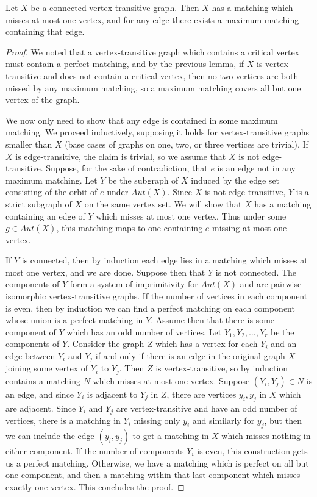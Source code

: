 \begin{theorem}
	Let $X$ be a connected vertex-transitive graph.  Then $X$ has a matching which misses at most one vertex, and for any edge there exists a maximum matching containing that edge.  
\end{theorem}
\begin{proof}
	We noted that a vertex-transitive graph which contains a critical vertex must contain a perfect matching, and by the previous lemma, if $X$ is vertex-transitive and does not contain a critical vertex, then no two vertices are both missed by any maximum matching, so a maximum matching covers all but one vertex of the graph.
	
	We now only need to show that any edge is contained in some maximum matching.  We proceed inductively, supposing it holds for vertex-transitive graphs smaller than $X$ (base cases of graphs on one, two, or three vertices are trivial).  If $X$ is edge-transitive, the claim is trivial, so we assume that $X$ is not edge-transitive.  Suppose, for the sake of contradiction, that $e$ is an edge not in any maximum matching. Let $Y$ be the subgraph of $X$ induced by the edge set consisting of the orbit of $e$ under $Aut(X)$.  Since $X$ is not edge-transitive, $Y$ is a strict subgraph of $X$ on the same vertex set.  We will show that $X$ has  a matching containing an edge of $Y$ which misses at most one vertex.  Thus under some $g\in Aut(X)$, this matching maps to one containing $e$ missing at most one vertex.
	
	If $Y$ is connected, then by induction each edge lies in a matching which misses at most one vertex, and we are done.  Suppose then that $Y$ is not connected.  The components of $Y$ form a system of imprimitivity for $Aut(X)$ and are pairwise isomorphic vertex-transitive graphs.  If the number of vertices in each component is even, then by induction we can find a perfect matching on each component whose union is a perfect matching in $Y$.  Assume then that there is some component of $Y$ which has an odd number of vertices.  Let $Y_1,Y_2,\dots,Y_r$ be the components of $Y$.  Consider the graph $Z$ which has a vertex for each $Y_i$ and an edge between $Y_i$ and $Y_j$ if and only if there is an edge in the original graph $X$ joining some vertex of $Y_i$ to $Y_j$.  Then $Z$ is vertex-transitive, so by induction contains a matching $N$ which misses at most one vertex.  Suppose $(Y_i,Y_j)\in N$ is an edge, and since $Y_i$ is adjacent to $Y_j$ in $Z$, there are vertices $y_i,y_j$ in $X$ which are adjacent.  Since $Y_i$ and $Y_j$ are vertex-transitive and have an odd number of vertices, there is a matching in $Y_i$ missing only $y_i$ and similarly for $y_j$, but then we can include the edge $(y_i,y_j)$ to get a matching in $X$ which misses nothing in either component.  If the number of components $Y_i$ is even, this construction gets us a perfect matching.  Otherwise, we have a matching which is perfect on all but one component, and then a matching within that last component which misses exactly one vertex.  This concludes the proof.
\end{proof}





